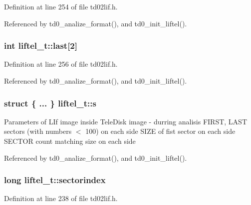 Definition at line 254 of file td02lif.\+h.



Referenced by td0\+\_\+analize\+\_\+format(), and td0\+\_\+init\+\_\+liftel().

\subsubsection[{\texorpdfstring{last}{last}}]{\setlength{\rightskip}{0pt plus 5cm}int liftel\+\_\+t\+::last\mbox{[}2\mbox{]}}\hypertarget{structliftel__t_accda68319750f6ea7a63948fb0d7d223}{}\label{structliftel__t_accda68319750f6ea7a63948fb0d7d223}


Definition at line 256 of file td02lif.\+h.



Referenced by td0\+\_\+analize\+\_\+format(), and td0\+\_\+init\+\_\+liftel().

\subsubsection[{\texorpdfstring{s}{s}}]{\setlength{\rightskip}{0pt plus 5cm}struct \{ ... \}   liftel\+\_\+t\+::s}\hypertarget{structliftel__t_a73a275fa51f9aa617d3975ac29d1befa}{}\label{structliftel__t_a73a275fa51f9aa617d3975ac29d1befa}
Parameters of L\+If image inside Tele\+Disk image -\/ durring analisis F\+I\+R\+ST, L\+A\+ST sectors (with numbers $<$ 100) on each side S\+I\+ZE of fist sector on each side S\+E\+C\+T\+OR count matching size on each side 

Referenced by td0\+\_\+analize\+\_\+format(), and td0\+\_\+init\+\_\+liftel().

\subsubsection[{\texorpdfstring{sectorindex}{sectorindex}}]{\setlength{\rightskip}{0pt plus 5cm}long liftel\+\_\+t\+::sectorindex}\hypertarget{structliftel__t_a13e9f8b2e23d8f028f456d4465beb4d5}{}\label{structliftel__t_a13e9f8b2e23d8f028f456d4465beb4d5}


Definition at line 238 of file td02lif.\+h.



